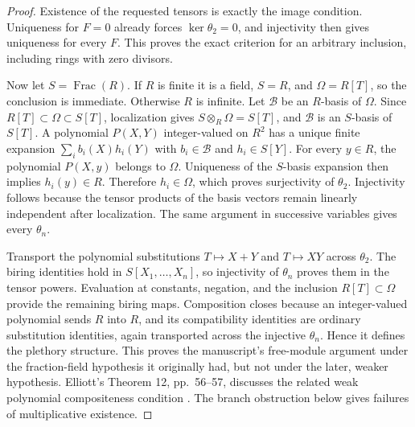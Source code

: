 \documentclass[11pt,a4paper]{article}
\theoremstyle{definition}
\begin{document}
\begin{proof}
Existence of the requested tensors is exactly the image condition.
Uniqueness for $F=0$ already forces $\ker\theta_2=0$, and injectivity
then gives uniqueness for every $F$. This proves the exact criterion
for an arbitrary inclusion, including rings with zero divisors.

Now let $S=\operatorname{Frac}(R)$. If $R$ is finite it is a field,
$S=R$, and $\Omega=R[T]$, so the conclusion is immediate. Otherwise
$R$ is infinite. Let $\mathcal B$ be an $R$-basis of $\Omega$.
Since $R[T]\subset\Omega\subset S[T]$, localization gives
$S\otimes_R\Omega=S[T]$, and $\mathcal B$ is an $S$-basis of
$S[T]$. A polynomial $P(X,Y)$ integer-valued on $R^2$ has a unique
finite expansion $\sum_i b_i(X)h_i(Y)$ with $b_i\in\mathcal B$ and
$h_i\in S[Y]$. For every $y\in R$, the polynomial $P(X,y)$ belongs
to $\Omega$. Uniqueness of the $S$-basis expansion then implies
$h_i(y)\in R$. Therefore $h_i\in\Omega$, which proves surjectivity
of $\theta_2$. Injectivity follows because the tensor products of
the basis vectors remain linearly independent after localization.
The same argument in successive variables gives every $\theta_n$.

Transport the polynomial substitutions $T\mapsto X+Y$ and
$T\mapsto XY$ across $\theta_2$. The biring identities hold in
$S[X_1,\ldots,X_n]$, so injectivity of $\theta_n$ proves them in
the tensor powers. Evaluation at constants, negation, and the
inclusion $R[T]\subset\Omega$ provide the remaining biring maps.
Composition closes because an integer-valued polynomial sends
$R$ into $R$, and its compatibility identities are ordinary
substitution identities, again transported across the injective
$\theta_n$. Hence it defines the plethory structure. This proves
the manuscript's free-module argument under the fraction-field
hypothesis it originally had, but not under the later, weaker
hypothesis. Elliott's Theorem 12, pp.~56--57, discusses the related
weak polynomial compositeness condition \cite{Elliott2010}.
The branch obstruction below gives failures of multiplicative existence.
\end{proof}
\end{document}
